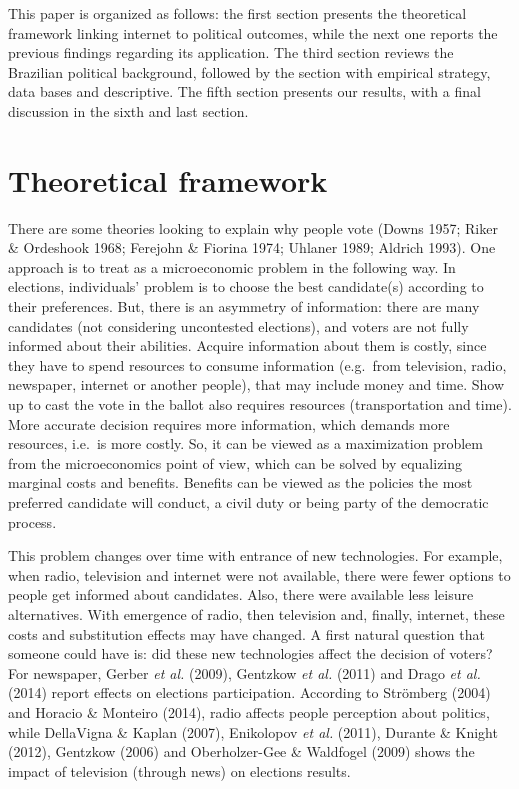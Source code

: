 \documentclass[
  12pt,
]{article}
\begin{document}
This paper is organized as follows: the first section presents the
theoretical framework linking internet to political outcomes, while the
next one reports the previous findings regarding its application. The
third section reviews the Brazilian political background, followed by
the section with empirical strategy, data bases and descriptive. The
fifth section presents our results, with a final discussion in the sixth
and last section.

\hypertarget{theoretical-framework}{%
\section{Theoretical framework}\label{theoretical-framework}}

There are some theories looking to explain why people vote (Downs 1957;
Riker \& Ordeshook 1968; Ferejohn \& Fiorina 1974; Uhlaner 1989; Aldrich
1993). One approach is to treat as a microeconomic problem in the
following way. In elections, individuals' problem is to choose the best
candidate(s) according to their preferences. But, there is an asymmetry
of information: there are many candidates (not considering uncontested
elections), and voters are not fully informed about their abilities.
Acquire information about them is costly, since they have to spend
resources to consume information (e.g.~from television, radio,
newspaper, internet or another people), that may include money and time.
Show up to cast the vote in the ballot also requires resources
(transportation and time). More accurate decision requires more
information, which demands more resources, i.e.~is more costly. So, it
can be viewed as a maximization problem from the microeconomics point of
view, which can be solved by equalizing marginal costs and benefits.
Benefits can be viewed as the policies the most preferred candidate will
conduct, a civil duty or being party of the democratic process.

This problem changes over time with entrance of new technologies. For
example, when radio, television and internet were not available, there
were fewer options to people get informed about candidates. Also, there
were available less leisure alternatives. With emergence of radio, then
television and, finally, internet, these costs and substitution effects
may have changed. A first natural question that someone could have is:
did these new technologies affect the decision of voters? For newspaper,
Gerber \emph{et al.} (2009), Gentzkow \emph{et al.} (2011) and Drago
\emph{et al.} (2014) report effects on elections participation.
According to Strömberg (2004) and Horacio \& Monteiro (2014), radio
affects people perception about politics, while DellaVigna \& Kaplan
(2007), Enikolopov \emph{et al.} (2011), Durante \& Knight (2012),
Gentzkow (2006) and Oberholzer-Gee \& Waldfogel (2009) shows the impact
of television (through news) on elections results.
\end{document}
